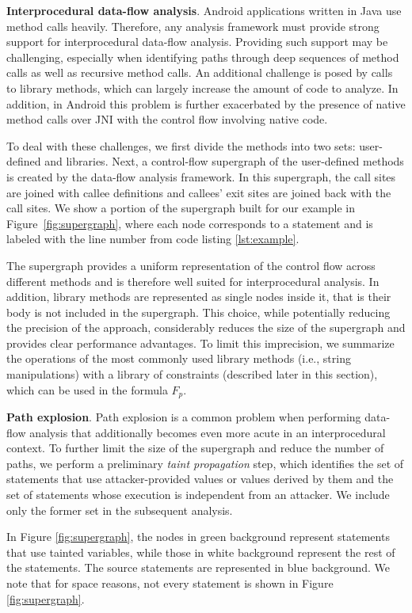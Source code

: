 \noindent
\textbf{Interprocedural data-flow analysis}. Android applications written in Java use method calls heavily. Therefore, any analysis framework must provide strong support for interprocedural data-flow analysis. Providing such support may be challenging, especially when identifying paths through deep sequences of method calls as well as recursive method calls. An additional challenge is posed by calls to library methods, which can largely increase the amount of code to analyze. In addition, in Android this problem is further exacerbated by the presence of native method calls over JNI with the control flow involving native code.

To deal with these challenges, we first divide the methods into two sets: user-defined and libraries. Next, a control-flow supergraph of the user-defined methods is created by the data-flow analysis framework. In this supergraph, the call sites are joined with callee definitions and callees' exit sites are joined back with the call sites. We show a portion of the supergraph built for our example in Figure~\ref{fig:supergraph}, where each node corresponds to a statement and is labeled with the line number from code listing \ref{lst:example}. 

The supergraph provides a uniform representation of the control flow across different methods and is therefore well suited for interprocedural analysis. In addition, library methods are represented as single nodes inside it, that is their body is not included in the supergraph. This choice, while potentially reducing the precision of the approach, considerably reduces the size of the supergraph and provides clear performance advantages. To limit this imprecision, we summarize the operations of the most commonly used library methods (i.e., string manipulations) with a library of constraints (described later in this section), which can be used in the formula $F_p$.

\noindent
\textbf{Path explosion}. Path explosion is a common problem when performing data-flow analysis that additionally becomes even more acute in an interprocedural context. To further limit the size of the supergraph and reduce the number of paths, we perform a preliminary \textit{taint propagation} step, which identifies the set of statements that use attacker-provided values or values derived by them and the set of statements whose execution is independent from an attacker. We include only the former set in the subsequent analysis.

In Figure \ref{fig:supergraph}, the nodes in green background represent statements that use tainted variables, while those in white background represent the rest of the statements. The source statements are represented in blue background. We note that for space reasons, not every statement is shown in Figure \ref{fig:supergraph}. 

